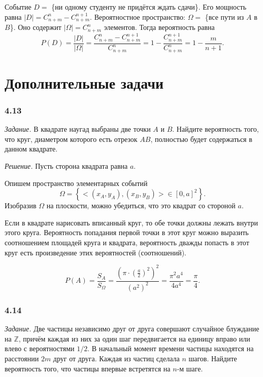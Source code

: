 Событие $D =$ \{ни одному студенту не придётся ждать сдачи\}.
Его мощность равна $ \left| D \right| = C_{n+m}^n - C_{n+m}^{n+1}$.
Вероятностное пространство: $ \Omega =$ \{все пути из $A$ в $B$\}.
Оно содержит $ \left| \Omega \right| = C_{n+m}^n$ элементов.
Тогда вероятность равна
$$P \left( D \right) =
\frac{ \left| D \right| }{ \left| \Omega \right| } =
\frac{C_{n+m}^n - C_{n+m}^{n+1}}{C_{n+m}^n} =
1 - \frac{C_{n+m}^{n+1}}{C_{n+m}^n} =
1 - \frac{m}{n+1}.$$

\section*{Дополнительные задачи}

\subsubsection*{4.13}

\textit{Задание.} В квадрате наугад выбраны две точки $A$ и $B$.
Найдите вероятность того, что круг, диаметром которого есть отрезок $AB$, полностью будет содержаться в данном квадрате.

\textit{Решение.} Пусть сторона квадрата равна $a$.

Опишем пространство элементарных событий
$$ \Omega =
\left\{ < \left( x_A, y_A \right), \left( x_B, y_B \right) > \in \left[ 0, a \right]^2 \right\}.$$
Изобразив $ \Omega $ на плоскости, можно убедиться, что это квадрат со стороной $a$.

Если в квадрате нарисовать вписанный круг, то обе точки должны лежать внутри этого круга.
Вероятность попадания первой точки в этот круг можно выразить соотношением площадей круга и квадрата,
вероятность дважды попасть в этот круг есть произведение этих вероятностей (соотношений).

$$P \left( A \right) =
\frac{S_A}{S_{ \Omega }} =
\frac{ \left( \pi \cdot \left( \frac{a}{2} \right)^2 \right)^2}{ \left( a^2 \right)^2} =
\frac{ \pi^2 a^4}{4a^4} =
\frac{ \pi }{4}.$$

\subsubsection*{4.14}

\textit{Задание.}
Две частицы независимо друг от друга совершают случайное блуждание на $ \mathbb{Z} $,
причём каждая из них за один шаг передвигается на единицу вправо или влево с вероятностями $1/2$.
В начальный момент времени частицы находятся на расстоянии $2m$ друг от друга.
Каждая из частиц сделала $n$ шагов.
Найдите вероятность того, что частицы впервые встретятся на $n$-м шаге.

